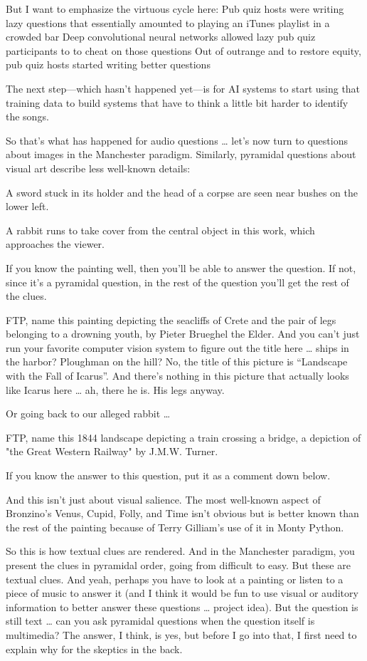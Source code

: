 But I want to emphasize the virtuous cycle here:
Pub quiz hosts were writing lazy questions that essentially amounted to playing an iTunes playlist in a crowded bar
Deep convolutional neural networks allowed lazy pub quiz participants to to cheat on those questions
Out of outrange and to restore equity, pub quiz hosts started writing better questions

The next step—which hasn’t happened yet—is for AI systems to start using that training data to build systems that have to think a little bit harder to identify the songs.

So that’s what has happened for audio questions … let’s now turn to questions about images in the Manchester paradigm.  Similarly, pyramidal questions about visual art describe less well-known details:

A sword stuck in its holder and the head of a corpse are seen near bushes on the lower left.

A rabbit runs to take cover from the central object in this work, which approaches the viewer.

If you know the painting well, then you’ll be able to answer the question.  If not, since it’s a pyramidal question, in the rest of the question you’ll get the rest of the clues.    

FTP, name this painting depicting the seacliffs of Crete and the pair of legs belonging to a drowning youth, by Pieter Brueghel the Elder.  And you can’t just run your favorite computer vision system to figure out the title here … ships in the harbor? Ploughman on the hill?  No, the title of this picture is “Landscape with the Fall of Icarus”.  And there’s nothing in this picture that actually looks like Icarus here … ah, there he is.  His legs anyway. 

Or going back to our alleged rabbit … 

FTP, name this 1844 landscape depicting a train crossing a bridge, a depiction of "the Great Western Railway" by J.M.W. Turner.

If you know the answer to this question, put it as a comment down below.  

And this isn’t just about visual salience.  The most well-known aspect of Bronzino’s Venus, Cupid, Folly, and Time isn’t obvious but is better known than the rest of the painting because of Terry Gilliam’s use of it in Monty Python.

So this is how textual clues are rendered.  And in the Manchester paradigm, you present the clues in pyramidal order, going from difficult to easy.  But these are textual clues.  And yeah, perhaps you have to look at a painting or listen to a piece of music to answer it (and I think it would be fun to use visual or auditory information to better answer these questions … project idea).  But the question is still text … can you ask pyramidal questions when the question itself is multimedia?  The answer, I think, is yes, but before I go into that, I first need to explain why for the skeptics in the back.

